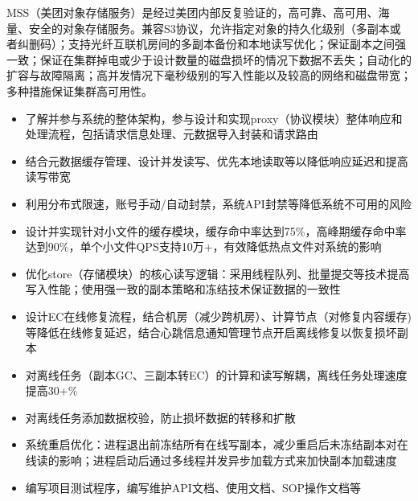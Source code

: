 \documentclass{resume}
\begin{document}
MSS（美团对象存储服务）是经过美团内部反复验证的，高可靠、高可用、海量、安全的对象存储服务。兼容S3协议，允许指定对象的持久化级别（多副本或者纠删码）；支持光纤互联机房间的多副本备份和本地读写优化；保证副本之间强一致；保证在集群掉电或少于设计数量的磁盘损坏的情况下数据不丢失；自动化的扩容与故障隔离；高并发情况下毫秒级别的写入性能以及较高的网络和磁盘带宽；多种措施保证集群高可用性。
\begin{itemize}
  \item 了解并参与系统的整体架构，参与设计和实现proxy（协议模块）整体响应和处理流程，包括请求信息处理、元数据导入封装和请求路由
  \item 结合元数据缓存管理、设计并发读写、优先本地读取等以降低响应延迟和提高读写带宽
  \item 利用分布式限速，账号手动/自动封禁，系统API封禁等降低系统不可用的风险
  \item 设计并实现针对小文件的缓存模块，缓存命中率达到75\%，高峰期缓存命中率达到90\%，单个小文件QPS支持10万+，有效降低热点文件对系统的影响
  \item 优化store（存储模块）的核心读写逻辑：采用线程队列、批量提交等技术提高写入性能；使用强一致的副本策略和冻结技术保证数据的一致性
  \item 设计EC在线修复流程，结合机房（减少跨机房）、计算节点（对修复内容缓存)等降低在线修复延迟，结合心跳信息通知管理节点开启离线修复以恢复损坏副本
  \item 对离线任务（副本GC、三副本转EC）的计算和读写解耦，离线任务处理速度提高30+\%
  \item 对离线任务添加数据校验，防止损坏数据的转移和扩散
  \item 系统重启优化：进程退出前冻结所有在线写副本，减少重启后未冻结副本对在线读的影响；进程启动后通过多线程并发异步加载方式来加快副本加载速度
  \item 编写项目测试程序，编写维护API文档、使用文档、SOP操作文档等
\end{itemize}

\end{document}
